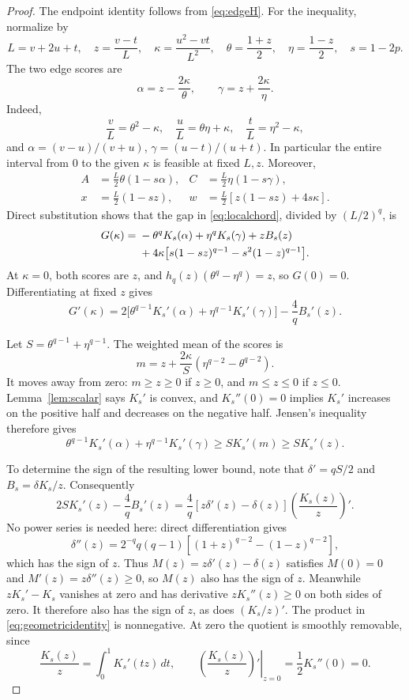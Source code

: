 \documentclass[11pt,a4paper]{amsart}
\numberwithin{equation}{section}
\theoremstyle{remark}
\begin{document}
\begin{proof}
The endpoint identity follows from \eqref{eq:edgeH}. For the inequality,
normalize by
\[
L=v+2u+t,\quad z=\frac{v-t}{L},\quad
\kappa=\frac{u^2-vt}{L^2},\quad
\theta=\frac{1+z}{2},\quad\eta=\frac{1-z}{2},\quad s=1-2p.
\]
The two edge scores are
\[
\alpha=z-\frac{2\kappa}{\theta},\qquad
\gamma=z+\frac{2\kappa}{\eta}.
\]
Indeed,
\[
\frac vL=\theta^2-\kappa,\quad
\frac uL=\theta\eta+\kappa,\quad
\frac tL=\eta^2-\kappa,
\]
and $\alpha=(v-u)/(v+u)$, $\gamma=(u-t)/(u+t)$. In particular the
entire interval from $0$ to the given $\kappa$ is feasible at fixed
$L,z$. Moreover,
\begin{align*}
A&=\frac L2\theta(1-s\alpha),&
C&=\frac L2\eta(1-s\gamma),\\
x&=\frac L2(1-sz),&
w&=\frac L2[z(1-sz)+4s\kappa].
\end{align*}
Direct substitution shows that the gap in \eqref{eq:localchord},
divided by $(L/2)^q$, is
\begin{align}
G(\kappa)={}&-\theta^qK_s(\alpha)+\eta^qK_s(\gamma)+zB_s(z)
\notag\\
&+4\kappa\bigl[s(1-sz)^{q-1}-s^2(1-z)^{q-1}\bigr].
\label{eq:normalizedgap}
\end{align}
At $\kappa=0$, both scores are $z$, and $h_q(z)(\theta^q-\eta^q)=z$,
so $G(0)=0$. Differentiating at fixed $z$ gives
\begin{equation}
G'(\kappa)=2\bigl[\theta^{q-1}K_s'(\alpha)
 +\eta^{q-1}K_s'(\gamma)\bigr]-\frac4qB_s'(z).
\label{eq:curvaturederivative}
\end{equation}

Let $S=\theta^{q-1}+\eta^{q-1}$. The weighted mean of the scores is
\[
m=z+\frac{2\kappa}{S}(\eta^{q-2}-\theta^{q-2}).
\]
It moves away from zero: $m\ge z\ge0$ if $z\ge0$, and $m\le z\le0$
if $z\le0$. Lemma~\ref{lem:scalar} says $K_s'$ is convex, and
$K_s''(0)=0$ implies $K_s'$ increases on the positive half and
decreases on the negative half. Jensen's inequality therefore gives
\begin{equation}
\theta^{q-1}K_s'(\alpha)+\eta^{q-1}K_s'(\gamma)
 \ge S K_s'(m)\ge S K_s'(z).
\label{eq:jensen}
\end{equation}

To determine the sign of the resulting lower bound, note that
$\delta'=qS/2$ and $B_s=\delta K_s/z$. Consequently
\begin{equation}
2S K_s'(z)-\frac4qB_s'(z)
=\frac4q[z\delta'(z)-\delta(z)]
  \left(\frac{K_s(z)}z\right)'.
\label{eq:geometricidentity}
\end{equation}
No power series is needed here: direct differentiation gives
\[
\delta''(z)=2^{-q}q(q-1)
 [(1+z)^{q-2}-(1-z)^{q-2}],
\]
which has the sign of $z$. Thus $M(z)=z\delta'(z)-\delta(z)$
satisfies $M(0)=0$ and $M'(z)=z\delta''(z)\ge0$, so $M(z)$
also has the sign of $z$.
Meanwhile $zK_s'-K_s$ vanishes at zero and has derivative
$zK_s''(z)\ge0$ on both sides of zero. It therefore also has the
sign of $z$, as does $(K_s/z)'$. The product in
\eqref{eq:geometricidentity} is nonnegative. At zero the quotient is
smoothly removable, since
\[
 \frac{K_s(z)}z=\int_0^1K_s'(tz)\,dt,\qquad
 \left.\left(\frac{K_s(z)}z\right)'\right|_{z=0}
 =\frac12 K_s''(0)=0.
\]


\end{proof}
\end{document}
